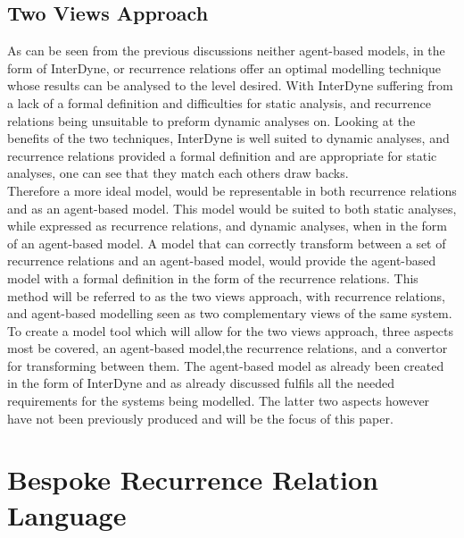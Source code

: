\documentclass{article}
\begin{document}
\subsection{Two Views Approach} 
As can be seen from the previous discussions neither agent-based models, in the form of InterDyne, or recurrence relations offer an optimal modelling technique whose results can be analysed to the level desired. With InterDyne suffering from a lack of a formal definition and difficulties for static analysis, and recurrence relations being unsuitable to preform dynamic analyses on. Looking at the benefits of the two techniques, InterDyne is well suited to dynamic analyses, and recurrence relations provided a formal definition and are appropriate for static analyses, one can see that they match each others draw backs.\\ 
Therefore a more ideal model, would be representable in both recurrence relations and as an agent-based model.  This model would be suited to both static analyses, while expressed as recurrence relations, and dynamic analyses, when in the form of an agent-based model. A model that can correctly transform between a set of recurrence relations and an agent-based model, would provide the agent-based model with a formal definition in the form of the recurrence relations. This method will be referred to as the two views approach, with recurrence relations, and agent-based modelling seen as two complementary views of the same system.\\
To create a model tool which will allow for the two views approach, three aspects most be covered, an agent-based model,the recurrence relations, and a convertor for transforming between them. The agent-based model as already been created in the form of InterDyne and as already discussed fulfils all the needed requirements for the systems being modelled. The latter two aspects however have not been previously produced and will be the focus of this paper.      


\section{Bespoke Recurrence Relation Language}

\end{document}

